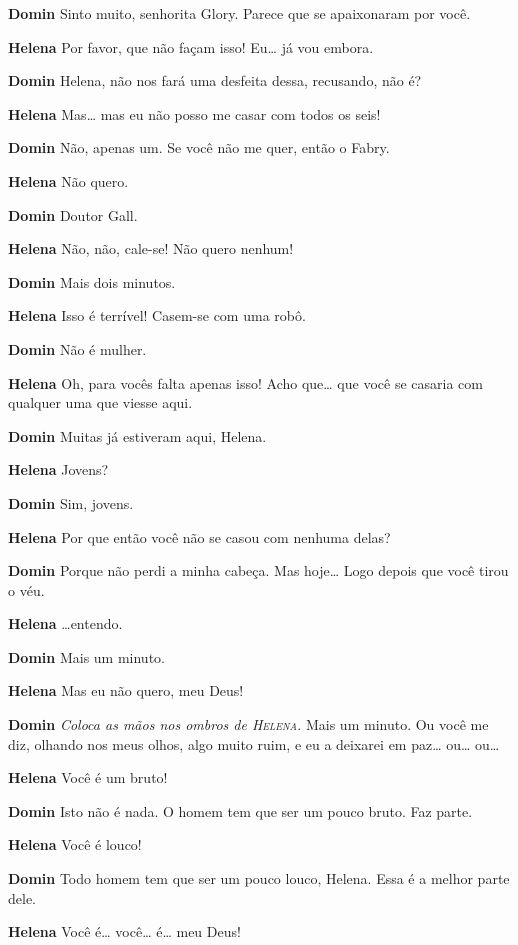 \textbf{Domin} Sinto muito, senhorita Glory. Parece que se apaixonaram por você.

\textbf{Helena} Por favor, que não façam isso! Eu\ldots{} já vou embora.

\textbf{Domin} Helena, não nos fará uma desfeita dessa, recusando, não é?

\textbf{Helena} Mas\ldots{} mas eu não posso me casar com todos os seis!

\textbf{Domin} Não, apenas um. Se você não me quer, então o Fabry.

\textbf{Helena} Não quero.

\textbf{Domin} Doutor Gall.

\textbf{Helena} Não, não, cale-se! Não quero nenhum!

\textbf{Domin} Mais dois minutos.

\textbf{Helena} Isso é terrível! Casem-se com uma robô.

\textbf{Domin} Não é mulher.

\textbf{Helena} Oh, para vocês falta apenas isso! Acho que\ldots{} que você se casaria com
qualquer uma que viesse aqui.

\textbf{Domin} Muitas já estiveram aqui, Helena.

\textbf{Helena} Jovens?

\textbf{Domin} Sim, jovens.

\textbf{Helena} Por que então você não se casou com nenhuma delas?

\textbf{Domin} Porque não perdi a minha cabeça. Mas hoje\ldots{} Logo depois que você
tirou o véu.

\textbf{Helena} \ldots{}entendo.

\textbf{Domin} Mais um minuto.

\textbf{Helena} Mas eu não quero, meu Deus!

\textbf{Domin} \emph{Coloca as mãos nos ombros de \textsc{Helena}.} Mais um minuto. Ou você me
diz, olhando nos meus olhos, algo muito ruim, e eu a deixarei em paz\ldots{} ou\ldots{} ou\ldots{}

\textbf{Helena} Você é um bruto!

\textbf{Domin} Isto não é nada. O homem tem que ser um pouco bruto. Faz parte.

\textbf{Helena} Você é louco!

\textbf{Domin} Todo homem tem que ser um pouco louco, Helena. Essa é a melhor parte
dele.

\textbf{Helena} Você é\ldots{} você\ldots{} é\ldots{} meu Deus!

